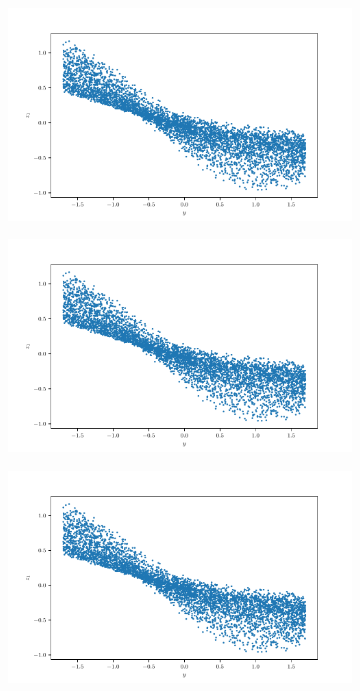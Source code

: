 \documentclass[10pt,a4paper]{article}
\begin{document}
\begin{figure}[!ht]
\begin{subfigure}{0.3\textwidth}
	\caption{}
	\label{cfig_xz2}
\end{subfigure}
\begin{subfigure}{0.3\textwidth}
	\centering	
	\includegraphics[width=\textwidth]{cube_trans_y_z1.pdf}
	\caption{}
	\label{cfig_yz0}
\end{subfigure}
\begin{subfigure}{0.3\textwidth}
	\centering
	\includegraphics[width=\textwidth] {cube_trans_y_z1.pdf}
	\caption{}
	\label{cfig_yz1}
\end{subfigure}
\begin{subfigure}{0.3\textwidth}
	\centering	
	\includegraphics[width=\textwidth]{cube_trans_y_z1.pdf}

\end{subfigure}
\end{figure}
\end{document}
